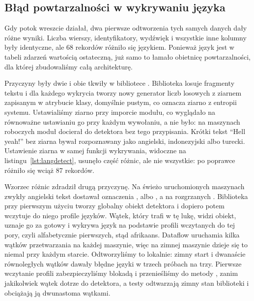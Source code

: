 \subsection{Błąd powtarzalności w wykrywaniu języka}
\label{sec:impl-langdetect}

Gdy potok wreszcie działał, dwa pierwsze odtworzenia tych samych danych dały różne wyniki.
Liczba wierszy, identyfikatory, wydźwięk i wszystkie inne kolumny były identyczne, ale 68 rekordów różniło się językiem.
Ponieważ język jest w tabeli zdarzeń wartością ostateczną, już samo to łamało obietnicę powtarzalności, dla której zbudowaliśmy całą architekturę.

Przyczyny były dwie i obie tkwiły w bibliotece .
Biblioteka losuje fragmenty tekstu i dla każdego wykrycia tworzy nowy generator liczb losowych z ziarnem zapisanym w atrybucie klasy, domyślnie pustym, co oznacza ziarno z entropii systemu.
Ustawialiśmy ziarno przy imporcie modułu, co wyglądało na równoważne ustawianiu go przy każdym wywołaniu, a nie było: na maszynach roboczych moduł docierał do detektora bez tego przypisania.
Krótki tekst \enquote{Hell yeah!} bez ziarna bywał rozpoznawany jako angielski, indonezyjski albo turecki.
Ustawienie ziarna w samej funkcji wykrywania, widoczne na listingu~\ref{lst:langdetect}, usunęło część różnic, ale nie wszystkie: po poprawce różniło się wciąż 87 rekordów.



Wzorzec różnic zdradził drugą przyczynę.
Na świeżo uruchomionych maszynach zwykły angielski tekst dostawał oznaczenia ,  albo , a na rozgrzanych .
Biblioteka przy pierwszym użyciu tworzy globalny obiekt detektora i dopiero potem wczytuje do niego profile języków.
Wątek, który trafi w tę lukę, widzi obiekt, uznaje go za gotowy i wykrywa język na podstawie profili wczytanych do tej pory, czyli alfabetycznie pierwszych, stąd afrikaans.
Dataflow uruchamia kilka wątków przetwarzania na każdej maszynie, więc na zimnej maszynie dzieje się to niemal przy każdym starcie.
Odtworzyliśmy to lokalnie: zimny start i dwanaście równoległych wątków dawały błędne języki w trzech próbach na trzy.
Pierwsze wczytanie profili zabezpieczyliśmy blokadą i przenieśliśmy do metody , zanim jakikolwiek wątek dotrze do detektora, a testy odtwarzają zimny stan biblioteki i obciążają ją dwunastoma wątkami.

